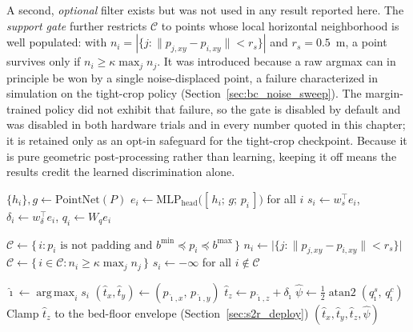 A second, \emph{optional} filter exists but was not used in any result
reported here. The \emph{support gate} further restricts $\mathcal{C}$ to
points whose local horizontal neighborhood is well populated: with
$n_i = \left| \{ j : \lVert p_{j,xy} - p_{i,xy} \rVert < r_s \} \right|$ and
$r_s = 0.5$~m, a point survives only if $n_i \ge \kappa \max_j n_j$. It was
introduced because a raw argmax can in principle be won by a single
noise-displaced point, a failure characterized in simulation on the
tight-crop policy (Section~\ref{sec:bc_noise_sweep}). The margin-trained
policy did not exhibit that failure, so the gate is disabled by default and
was disabled in both hardware trials and in every number quoted in this
chapter; it is retained only as an opt-in safeguard for the tight-crop
checkpoint. Because it is pure geometric post-processing rather than
learning, keeping it off means the results credit the learned
discrimination alone.

\begin{algorithm}[t]
\caption{Scoring-policy inference with admissibility masking}
\label{alg:scoring_decode}
\begin{algorithmic}

\State $\{h_i\}, g \gets \mathrm{PointNet}(P)$
\State $e_i \gets \mathrm{MLP}_{\mathrm{head}}\big([\,h_i;\, g;\, p_i\,]\big)$ for all $i$
\State $s_i \gets w_s^\top e_i$, \quad
       $\delta_i \gets w_\delta^\top e_i$, \quad
       $q_i \gets W_q e_i$

\State $\mathcal{C} \gets \{\, i : p_i \text{ is not padding and } b^{\min} \preceq p_i \preceq b^{\max} \,\}$
  \State $n_i \gets \big| \{ j : \lVert p_{j,xy} - p_{i,xy} \rVert < r_s \} \big|$
  \State $\mathcal{C} \gets \{\, i \in \mathcal{C} : n_i \ge \kappa \max_j n_j \,\}$
\EndIf
\State $s_i \gets -\infty$ for all $i \notin \mathcal{C}$

\State $\hat{\imath} \gets \operatorname*{arg\,max}_{i} s_i$
\State $(\hat{t}_x, \hat{t}_y) \gets (p_{\hat{\imath},x},\, p_{\hat{\imath},y})$
\State $\hat{t}_z \gets p_{\hat{\imath},z} + \delta_{\hat{\imath}}$
\State $\hat{\psi} \gets \tfrac{1}{2}\operatorname{atan2}(q^s_{\hat{\imath}},\, q^c_{\hat{\imath}})$
\State Clamp $\hat{t}_z$ to the bed-floor envelope (Section~\ref{sec:s2r_deploy})
\State \Return $(\hat{t}_x, \hat{t}_y, \hat{t}_z, \hat{\psi})$
\end{algorithmic}
\end{algorithm}

